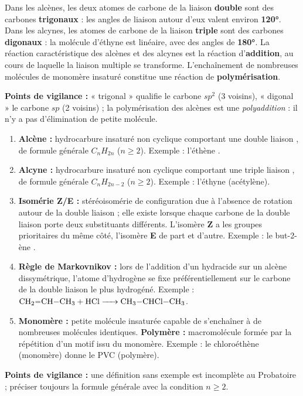 \documentclass[11pt]{article}
\begin{document}
\begin{corrige}
Dans les alcènes, les deux atomes de carbone de la liaison \textbf{double} sont des carbones \textbf{trigonaux} : les angles de liaison autour d'eux valent environ \textbf{\ang{120}}. Dans les alcynes, les atomes de carbone de la liaison \textbf{triple} sont des carbones \textbf{digonaux} : la molécule d'éthyne est linéaire, avec des angles de \textbf{\ang{180}}. La réaction caractéristique des alcènes et des alcynes est la réaction d'\textbf{addition}, au cours de laquelle la liaison multiple se transforme. L'enchaînement de nombreuses molécules de monomère insaturé constitue une réaction de \textbf{polymérisation}.

\textbf{Points de vigilance :} « trigonal » qualifie le carbone $sp^2$ (3 voisins), « digonal » le carbone $sp$ (2 voisins) ; la polymérisation des alcènes est une \emph{polyaddition} : il n'y a pas d'élimination de petite molécule.
\end{corrige}

\begin{corrige}
\begin{enumerate}
\item \textbf{Alcène :} hydrocarbure insaturé non cyclique comportant une double liaison , de formule générale $C_nH_{2n}$ ($n \geq 2$). Exemple : l'éthène .
\item \textbf{Alcyne :} hydrocarbure insaturé non cyclique comportant une triple liaison , de formule générale $C_nH_{2n-2}$ ($n \geq 2$). Exemple : l'éthyne  (acétylène).
\item \textbf{Isomérie Z/E :} stéréoisomérie de configuration due à l'absence de rotation autour de la double liaison  ; elle existe lorsque chaque carbone de la double liaison porte deux substituants différents. L'isomère \textbf{Z} a les groupes prioritaires du même côté, l'isomère \textbf{E} de part et d'autre. Exemple : le but-2-ène .
\item \textbf{Règle de Markovnikov :} lors de l'addition d'un hydracide  sur un alcène dissymétrique, l'atome d'hydrogène se fixe préférentiellement sur le carbone de la double liaison le plus hydrogéné. Exemple : $\ce{CH2=CH-CH3 + HCl -> CH3-CHCl-CH3}$.
\item \textbf{Monomère :} petite molécule insaturée capable de s'enchaîner à de nombreuses molécules identiques. \textbf{Polymère :} macromolécule formée par la répétition d'un motif issu du monomère. Exemple : le chloroéthène  (monomère) donne le PVC  (polymère).
\end{enumerate}
\textbf{Points de vigilance :} une définition sans exemple est incomplète au Probatoire ; préciser toujours la formule générale avec la condition $n \geq 2$.
\end{corrige}
\end{document}
